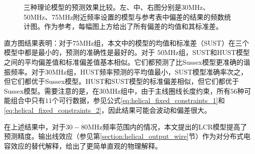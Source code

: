 \begin{figure}
    \centering
    \caption[三种理论模型的预测效果比较]{三种理论模型的预测效果比较。左、中、右图分别是30MHz、50MHz、75MHz附近频率设置的模型与参考表中偏差的结果的频数统计图。作为参考，每幅图上方给出了所有偏差的均值和其标准差。\label{fig:helical_freqmodelcompare}}

\end{figure}



直方图结果表明：对于$75$MHz组，本文中的模型的均值和标准差（SUST）在三个模型中都是最小的，预测的准确性是最好的。对于 $50$MHz组，SUST和HUST模型之间的平均偏差值和标准偏差值基本相似。它们都预测了比Sussex模型更准确的谐振频率。对于$30$MHz组，HUST频率预测的平均值最小，SUST模型准确率次之，但它们都优于Sussex模型。HUST和SUST模型的标准偏差相似，但它们都优于Sussex模型。需要注意的是，在30MHz组中，由于主线圈线长度约束，所有$56$种可能组合中只有$11$个可行数据，参见公式\eqref{eq:helical_fixed_constraints_1}和\eqref{eq:helical_fixed_constraints_2}，因此结果可能会波动和偏差很大。

在上述结果中，对于$30-80$MHz频率范围内的情况，本文提出的LCR模型提高了预测精度。输出线效应（参见第\ref{section:helical_output_wire}节）作为对分布式电容效应的替代解释，给出了更简单直观的物理解释。

